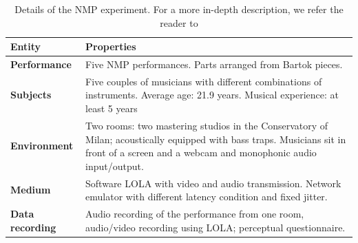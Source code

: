 \begin{table}[b]
	\centering
	\caption{Details of the NMP experiment. For a more in-depth description, we refer the reader to \cite{CIM2018} }
	\begin{tabular}{p{1.5cm}p{6cm}}
		\hline
		\textbf{Entity} & \textbf{Properties} \\
		\hline
		\textbf{Performance} & Five NMP performances. \newline  Parts arranged from Bartok pieces. \\
		\textbf{Subjects} & Five couples of musicians with different combinations of instruments. Average age: 21.9 years. Musical experience: at least 5 years\\
		\textbf{Environment} & Two rooms: two mastering studios in the Conservatory of Milan; acoustically equipped with bass traps. Musicians sit in front of a screen and a webcam and monophonic audio input/output.\\
		\textbf{Medium} & Software LOLA with video and audio transmission. Network emulator with different latency condition and fixed jitter. \\
		\textbf{Data} \newline \textbf{recording} & Audio recording of the performance from one room, audio/video recording using LOLA; perceptual questionnaire.\\
		\hline
	\end{tabular}
	\label{tab:exp2}
\end{table}



